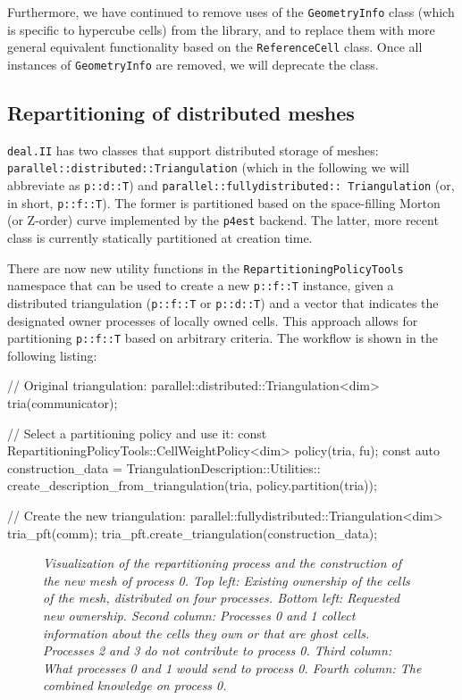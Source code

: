 \documentclass{ansarticle-preprint}
\newcommand{\specialword}[1]{\texttt{#1}}
\newcommand{\dealii}{{\specialword{deal.II}}\xspace}
\newcommand{\pfrst}{{\specialword{p4est}}\xspace}
\begin{document}
Furthermore, we have continued to remove uses of the
\texttt{GeometryInfo} class (which is specific to hypercube cells) from
the library, and to replace them with more general equivalent
functionality based on the
\texttt{ReferenceCell} class. Once all instances of
\texttt{GeometryInfo} are removed, we will deprecate the class.

\subsection{Repartitioning of distributed meshes}\label{sec:repartitioning}

\dealii has two classes that support distributed storage of meshes:
\texttt{parallel::\allowbreak distributed::\allowbreak Triangulation}
(which in the following we will abbreviate as \texttt{p::d::T}) and
\texttt{parallel::\allowbreak fully\allowbreak distributed::\allowbreak
  Triangulation} (or, in short, \texttt{p::f::T}). The former is
partitioned based on the space-filling Morton (or Z-order) curve
implemented by the \pfrst backend. The latter, more recent
class is currently statically partitioned at creation time.

There are now new utility functions in the
\texttt{RepartitioningPolicyTools} namespace that can be
used to create a new \texttt{p::f::T} instance,
given a distributed triangulation (\texttt{p::f::T} or
\texttt{p::d::T}) and a vector that indicates the designated owner processes of locally
owned cells. This approach allows for partitioning \texttt{p::f::T}
based on arbitrary criteria. The workflow is shown in the following listing:
\begin{c++}
// Original triangulation:
parallel::distributed::Triangulation<dim> tria(communicator);

// Select a partitioning policy and use it:
const RepartitioningPolicyTools::CellWeightPolicy<dim> policy(tria, fu);
const auto construction_data = TriangulationDescription::Utilities::
  create_description_from_triangulation(tria, policy.partition(tria));

// Create the new triangulation:
parallel::fullydistributed::Triangulation<dim> tria_pft(comm);
tria_pft.create_triangulation(construction_data);
\end{c++}

\begin{figure}
    \centering
    \def\svgwidth{0.8\columnwidth}
    
    \caption{\it Visualization of the repartitioning process and the
      construction of the new mesh of process 0. Top
      left: Existing ownership of the cells of the mesh, distributed
      on four processes. Bottom left:
      Requested new ownership. Second column: Processes 0 and 1
      collect information about the cells they own or that are ghost
      cells. Processes 2 and 3 do not contribute to process 0. Third column: What
      processes 0 and 1 would send to process 0. Fourth column: The
      combined knowledge on process 0.}\label{fig:repartitioning}
\end{figure}
\end{document}
